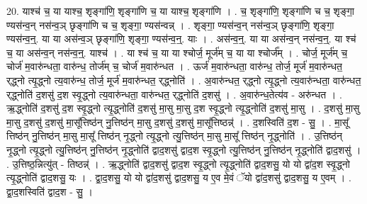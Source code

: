\documentclass[17pt]{extarticle}
\begin{document}
20. याश्च॑ च॒ या याश्च॒ शृङ्गा॑णि॒ शृङ्गा॑णि च॒ या याश्च॒ शृङ्गा॑णि । . च॒ शृङ्गा॑णि॒ शृङ्गा॑णि च च॒ शृङ्गा॒ ण्यस॑न्व॒न् नस॑न्व॒ञ् छृङ्गा॑णि च च॒ शृङ्गा॒ ण्यस॑न्वन्न् । . शृङ्गा॒ ण्यस॑न्व॒न् नस॑न्व॒ञ् छृङ्गा॑णि॒ शृङ्गा॒ ण्यस॑न्व॒न्॒. या या अस॑न्व॒ञ् छृङ्गा॑णि॒ शृङ्गा॒ ण्यस॑न्व॒न्॒. याः । . अस॑न्व॒न्॒. या या अस॑न्व॒न् नस॑न्व॒न्॒. या श्च॑ च॒ या अस॑न्व॒न् नस॑न्व॒न्॒. याश्च॑ । . या श्च॑ च॒ या या श्चोर्ज॒ मूर्ज॑म् च॒ या या श्चोर्ज᳚म् । . चोर्ज॒ मूर्ज॑म् च॒ चोर्ज॑ म॒वारु॑न्धता॒ वारु॑न्ध॒ तोर्ज॑म् च॒ चोर्ज॑ म॒वारु॑न्धत । . ऊर्ज॑ म॒वारु॑न्धता॒ वारु॑न्ध॒ तोर्ज॒ मूर्ज॑ म॒वारु॑न्धत॒ र्‌द्ध्नो त्यृ॒द्ध्नो त्य॒वारु॑न्ध॒ तोर्ज॒ मूर्ज॑ म॒वारु॑न्धत॒ र्‌द्ध्नोति॑ । . अ॒वारु॑न्धत॒ र्‌द्ध्नो त्यृ॒द्ध्नो त्य॒वारु॑न्धता॒ वारु॑न्धत॒ र्‌द्ध्नोति॑ द॒शसु॑ द॒श स्वृ॒द्ध्नो त्य॒वारु॑न्धता॒ वारु॑न्धत॒ र्‌द्ध्नोति॑ द॒शसु॑ । . अ॒वारु॑न्ध॒तेत्य॑व - अरु॑न्धत । . ऋ॒द्ध्नोति॑ द॒शसु॑ द॒श स्वृ॒द्ध्नो त्यृ॒द्ध्नोति॑ द॒शसु॑ मा॒सु मा॒सु द॒श स्वृ॒द्ध्नो त्यृ॒द्ध्नोति॑ द॒शसु॑ मा॒सु । . द॒शसु॑ मा॒सु मा॒सु द॒शसु॑ द॒शसु॑ मा॒सू᳚त्तिष्ठ॑न् नु॒त्तिष्ठ॑न् मा॒सु द॒शसु॑ द॒शसु॑ मा॒सू᳚त्तिष्ठन्न्॑ । . द॒शस्विति॑ द॒श - सु॒ । . मा॒सू᳚ त्तिष्ठ॑न् नु॒त्तिष्ठ॑न् मा॒सु मा॒सू᳚ त्तिष्ठ॑न् नृ॒द्ध्नो त्यृ॒द्ध्नो त्यु॒त्तिष्ठ॑न् मा॒सु मा॒सू᳚ त्तिष्ठ॑न् नृ॒द्ध्नोति॑ । . उ॒त्तिष्ठ॑न् नृ॒द्ध्नो त्यृ॒द्ध्नो त्यु॒त्तिष्ठ॑न् नु॒त्तिष्ठ॑न् नृ॒द्ध्नोति॑ द्वाद॒शसु॑ द्वाद॒श स्वृ॒द्ध्नो त्यु॒त्तिष्ठ॑न् नु॒त्तिष्ठ॑न् नृ॒द्ध्नोति॑ द्वाद॒शसु॑ । . उ॒त्तिष्ठ॒न्नित्यु॑त् - तिष्ठन्न्॑ । . ऋ॒द्ध्नोति॑ द्वाद॒शसु॑ द्वाद॒श स्वृ॒द्ध्नो त्यृ॒द्ध्नोति॑ द्वाद॒शसु॒ यो यो द्वा॑द॒श स्वृ॒द्ध्नो त्यृ॒द्ध्नोति॑ द्वाद॒शसु॒ यः । . द्वा॒द॒शसु॒ यो यो द्वा॑द॒शसु॑ द्वाद॒शसु॒ य ए॒व मे॒वं ॅयो द्वा॑द॒शसु॑ द्वाद॒शसु॒ य ए॒वम् । . द्वा॒द॒शस्विति॑ द्वाद॒श - सु॒ । \newline
\end{document}

